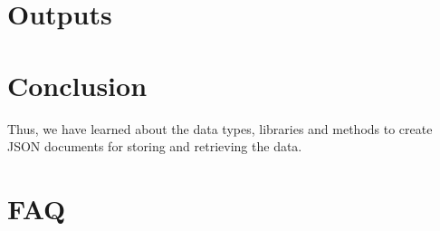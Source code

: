 \documentclass[11pt]{article}
\begin{document}
\section{Outputs}




\section{Conclusion}
Thus, we have learned about the data types, libraries and methods to create
JSON documents for storing and retrieving the data.
\clearpage

\section{FAQ}
\end{document}
